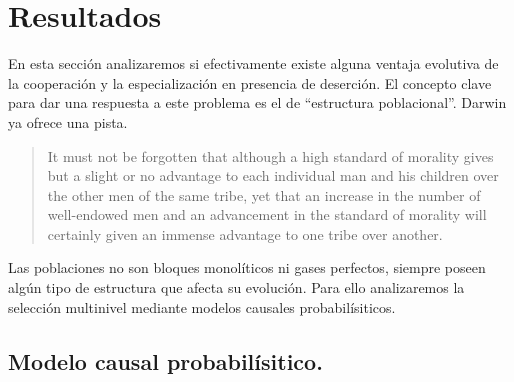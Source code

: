 \documentclass[a4paper,10pt]{article}
\begin{document}
\section{Resultados}

En esta sección analizaremos si efectivamente existe alguna ventaja evolutiva de la cooperación y la especialización en presencia de deserción.
%
El concepto clave para dar una respuesta a este problema es el de ``estructura poblacional''.
%
Darwin ya ofrece una pista.
%
\begin{quotation}
It must not be forgotten that although a high standard of morality gives but a slight or no advantage to each individual man and his children over the other men of the same tribe, yet that an increase in the number of well-endowed men and an advancement in the standard of morality will certainly given an immense advantage to one tribe over another.
\end{quotation}
%
Las poblaciones no son bloques monolíticos ni gases perfectos, siempre poseen algún tipo de estructura que afecta su evolución.
%
Para ello analizaremos la selección multinivel mediante modelos causales probabilísiticos.

\subsection{Modelo causal probabilísitico.}
\end{document}
